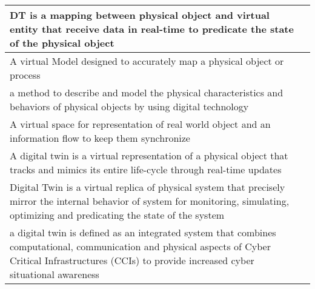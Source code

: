 \begin{table}[H]
\begin{NiceTabular}{p{10cm}|p{4cm}}
    \hline
    DT is a mapping between physical object and virtual entity that receive data in real-time to predicate the state of the physical object & \cite{dinglingsuzehuiquDetectionDDoSAttacks2022} \\
    
    \hline
    A virtual Model designed to accurately map a physical object or process & \cite{wangDTCPNDigitalTwin2022, sousaELEGANTSecurityCritical2021} \\
    
    \hline
    a method to describe and model the physical characteristics and behaviors of physical objects by using digital technology & \cite{wangSoCbasedDigitalTwin2020} \\
    
    \hline
    A virtual space for representation of real world object and an information flow to keep them synchronize  & \cite{giovannipaolosellittoEnablingZeroTrust2021}\\
    
    \hline
    A digital twin is a virtual representation of a physical object that tracks and mimics its entire life-cycle through real-time updates & \cite{vargheseDigitalTwinbasedIntrusion2022, dietzUnleashingDigitalTwin2020} \\
    
    \hline
    Digital Twin is a virtual replica of physical system that precisely mirror the internal behavior of system for monitoring, simulating, optimizing and predicating the state of the system & \cite{akbarianSecurityFrameworkDigital2021, akbarianIntrusionDetectionDigital2020} \\
    
    \hline
    a digital twin is defined as an integrated system that combines computational, communication and physical aspects of Cyber Critical Infrastructures (CCIs) to provide increased cyber situational awareness & \cite{salviCyberresilienceCriticalCyber2022, pirbhulalNovelFrameworkReinforcing2022} \\

    \hline
    
    
\bottomrule
\end{NiceTabular}
\end{table}